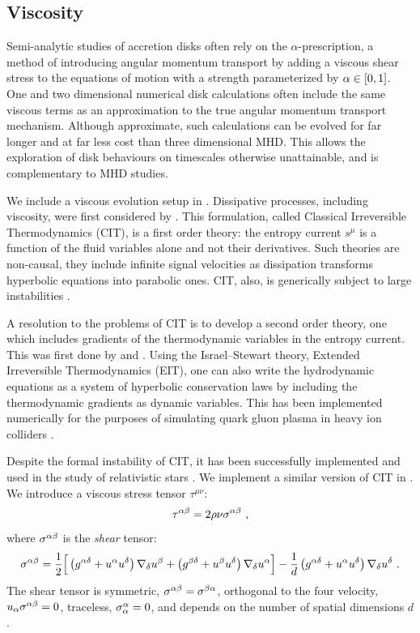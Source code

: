 \subsection{Viscosity}

Semi-analytic studies of accretion disks often rely on the $\alpha$-prescription, a method of introducing angular momentum transport by adding a viscous shear stress to the equations of motion with a strength parameterized by $\alpha \in [0,1]$.  One and two dimensional numerical disk calculations often include the same viscous terms as an approximation to the true angular momentum transport mechanism.  Although approximate, such calculations can be evolved for far longer and at far less cost than three dimensional MHD.  This allows the exploration of disk behaviours on timescales otherwise unattainable, and is complementary to MHD studies.

We include a viscous evolution setup in \grdisco.  Dissipative processes, including viscosity, were first considered by \citet{Eckart40}.  This formulation, called Classical Irreversible Thermodynamics (CIT), is a first order theory: the entropy current $s^\mu $ is a function of the fluid variables alone and not their derivatives.  Such theories are non-causal, they include infinite signal velocities as dissipation transforms hyperbolic equations into parabolic ones.  CIT, also, is generically subject to large instabilities \citep{Hiscock85}.

A resolution to the problems of CIT is to develop a second order theory, one which includes gradients of the thermodynamic variables in the entropy current.  This was first done by \citet{Israel76} and \citet{Stewart77}.  Using the Israel--Stewart theory, Extended Irreversible Thermodynamics (EIT), one can also write the hydrodynamic equations as a system of hyperbolic conservation laws by including the thermodynamic gradients as dynamic variables.  This has been implemented numerically for the purposes of simulating quark gluon plasma in heavy ion colliders \citep{DelZanna13}.

Despite the formal instability of CIT, it has been successfully implemented and used in the study of relativistic stars \citep{Duez04}.  We implement a similar version of CIT in \grdisco.  We introduce a viscous stress tensor $\tau^{\mu\nu}$:
\begin{equation}
	\tau^{\alpha \beta} = 2 \rho \nu \sigma^{\alpha \beta} \ ,
\end{equation}
where $\sigma^{\alpha \beta}$ is the \emph{shear} tensor:
\begin{equation}
	\sigma^{\alpha \beta} = \frac{1}{2}\Big[\left(g^{\alpha \delta} + u^\alpha u^\delta\right)\nabla_\delta u^\beta +  \left(g^{\beta \delta} + u^\beta u^\delta\right)\nabla_\delta u^\alpha\Big] - \frac{1}{d}\left(g^{\alpha \delta} + u^\alpha u^\delta\right)\nabla_\delta u^\delta\ .
\end{equation}
The shear tensor is symmetric, $\sigma^{\alpha \beta} = \sigma^{\beta \alpha}$, orthogonal to the four velocity, $u_\alpha \sigma^{\alpha \beta} = 0$, traceless, $\sigma^\alpha_\alpha = 0$, and depends on the number of spatial dimensions $d$.

